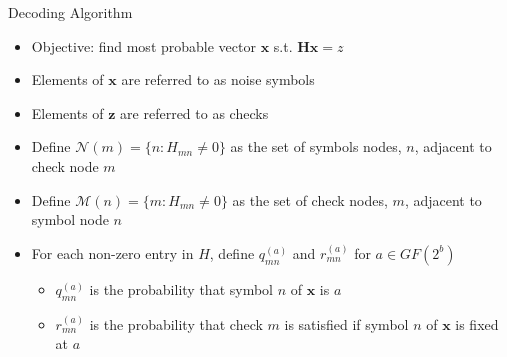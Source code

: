 \documentclass[10pt,ignorenonframetext,]{beamer}
\providecommand{\tightlist}{%
  \setlength{\itemsep}{0pt}\setlength{\parskip}{0pt}}
\begin{document}
\begin{frame}{Decoding Algorithm}
\protect\hypertarget{decoding-algorithm}{}
\begin{itemize}[<+->]
\tightlist
\item
  Objective: find most probable vector \(\textbf{x}\) s.t.
  \(\textbf{Hx}=z\)
\item
  Elements of \(\textbf{x}\) are referred to as noise symbols
\item
  Elements of \(\textbf{z}\) are referred to as checks
\item
  Define \(\mathcal{N}(m) = \{n:H_{mn}\neq 0\}\) as the set of symbols
  nodes, \(n\), adjacent to check node \(m\)
\item
  Define \(\mathcal{M}(n) = \{m:H_{mn}\neq 0\}\) as the set of check
  nodes, \(m\), adjacent to symbol node \(n\)
\item
  For each non-zero entry in \(H\), define \(q_{mn}^{(a)}\) and
  \(r_{mn}^{(a)}\) for \(a\in GF(2^b)\)

  \begin{itemize}[<+->]
  \tightlist
  \item
    \(q_{mn}^{(a)}\) is the probability that symbol \(n\) of
    \(\textbf{x}\) is \(a\)
  \item
    \(r_{mn}^{(a)}\) is the probability that check \(m\) is satisfied if
    symbol \(n\) of \(\textbf{x}\) is fixed at \(a\)
  \end{itemize}
\end{itemize}
\end{frame}
\end{document}
